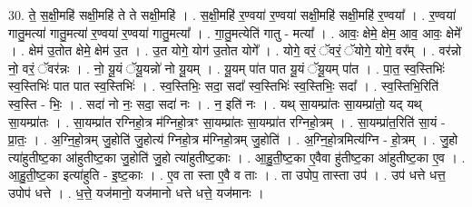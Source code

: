 \documentclass[17pt]{extarticle}
\begin{document}
30. ते॒ स॒क्षी॒महि॑ सक्षी॒महि॑ ते ते सक्षी॒महि॑ । . स॒क्षी॒महि॑ र॒ण्वया॑ र॒ण्वया॑ सक्षी॒महि॑ सक्षी॒महि॑ र॒ण्वया᳚ । . र॒ण्वया॑ गातु॒मत्या॑ गातु॒मत्या॑ र॒ण्वया॑ र॒ण्वया॑ गातु॒मत्या᳚ । . गा॒तु॒मत्येति॑ गातु - मत्या᳚ । . आवः॒ क्षेमे॒ क्षेम॒ आव॒ आवः॒ क्षेमे᳚ । . क्षेम॑ उ॒तोत क्षेमे॒ क्षेम॑ उ॒त । . उ॒त योगे॒ योग॑ उ॒तोत योगे᳚ । . योगे॒ वरं॒ ॅवरं॒ ॅयोगे॒ योगे॒ वर᳚म् । . वर॑न्नो नो॒ वरं॒ ॅवर॑न्नः । . नो॒ यू॒यं ॅयू॒यन्नो॑ नो यू॒यम् । . यू॒यम् पा॑त पात यू॒यं ॅयू॒यम् पा॑त । . पा॒त॒ स्व॒स्तिभिः॑ स्व॒स्तिभिः॑ पात पात स्व॒स्तिभिः॑ । . स्व॒स्तिभिः॒ सदा॒ सदा᳚ स्व॒स्तिभिः॑ स्व॒स्तिभिः॒ सदा᳚ । . स्व॒स्तिभि॒रिति॑ स्व॒स्ति - भिः॒ । . सदा॑ नो नः॒ सदा॒ सदा॑ नः । . न॒ इति॑ नः । . यथ् सा॒यम्प्रा॑तः सा॒यम्प्रा॑तो॒ यद् यथ् सा॒यम्प्रा॑तः । . सा॒यम्प्रा॑त रग्निहो॒त्र म॑ग्निहो॒त्रꣳ सा॒यम्प्रा॑तः सा॒यम्प्रा॑त रग्निहो॒त्रम् । . सा॒यम्प्रा॑त॒रिति॑ सा॒यं - प्रा॒तः॒ । . अ॒ग्नि॒हो॒त्रम् जु॒होति॑ जु॒होत्य॑ ग्निहो॒त्र म॑ग्निहो॒त्रम् जु॒होति॑ । . अ॒ग्नि॒हो॒त्रमित्य॑ग्नि - हो॒त्रम् । . जु॒हो त्या॑हुतीष्ट॒का आ॑हुतीष्ट॒का जु॒होति॑ जु॒हो त्या॑हुतीष्ट॒काः । . आ॒हु॒ती॒ष्ट॒का ए॒वैवा हु॑तीष्ट॒का आ॑हुतीष्ट॒का ए॒व । . आ॒हु॒ती॒ष्ट॒का इत्या॑हुति - इ॒ष्ट॒काः । . ए॒व ता स्ता ए॒वै व ताः । . ता उपोप॒ तास्ता उप॑ । . उप॑ धत्ते धत्त॒ उपोप॑ धत्ते । . ध॒त्ते॒ यज॑मानो॒ यज॑मानो धत्ते धत्ते॒ यज॑मानः । \newline
\end{document}
